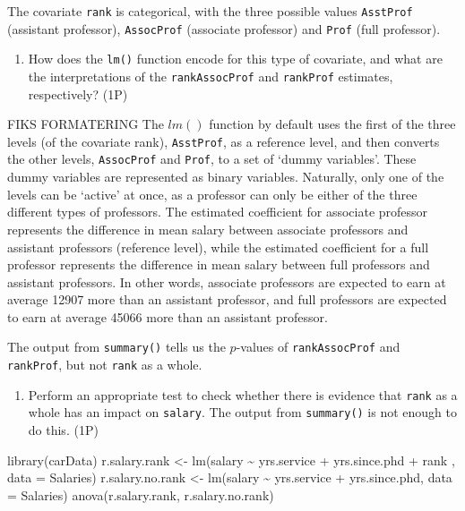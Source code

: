 \documentclass[
]{article}
\newenvironment{Shaded}{\begin{snugshade}}{\end{snugshade}}
\newcommand{\AttributeTok}[1]{\textcolor[rgb]{0.77,0.63,0.00}{#1}}
\newcommand{\FunctionTok}[1]{\textcolor[rgb]{0.00,0.00,0.00}{#1}}
\newcommand{\NormalTok}[1]{#1}
\newcommand{\OtherTok}[1]{\textcolor[rgb]{0.56,0.35,0.01}{#1}}
\newcommand{\SpecialCharTok}[1]{\textcolor[rgb]{0.00,0.00,0.00}{#1}}
\providecommand{\tightlist}{%
  \setlength{\itemsep}{0pt}\setlength{\parskip}{0pt}}
\begin{document}
The covariate \texttt{rank} is categorical, with the three possible
values \texttt{AsstProf} (assistant professor), \texttt{AssocProf}
(associate professor) and \texttt{Prof} (full professor).

\begin{enumerate}
\def\labelenumi{\roman{enumi})}
\tightlist
\item
  How does the \texttt{lm()} function encode for this type of covariate,
  and what are the interpretations of the \texttt{rankAssocProf} and
  \texttt{rankProf} estimates, respectively? (1P)
\end{enumerate}

FIKS FORMATERING The \(lm()\) function by default uses the first of the
three levels (of the covariate rank), \texttt{AsstProf}, as a reference
level, and then converts the other levels, \texttt{AssocProf} and
\texttt{Prof}, to a set of `dummy variables'. These dummy variables are
represented as binary variables. Naturally, only one of the levels can
be `active' at once, as a professor can only be either of the three
different types of professors. The estimated coefficient for associate
professor represents the difference in mean salary between associate
professors and assistant professors (reference level), while the
estimated coefficient for a full professor represents the difference in
mean salary between full professors and assistant professors. In other
words, associate professors are expected to earn at average 12907 more
than an assistant professor, and full professors are expected to earn at
average 45066 more than an assistant professor.

The output from \texttt{summary()} tells us the \(p\)-values of
\texttt{rankAssocProf} and \texttt{rankProf}, but not \texttt{rank} as a
whole.

\begin{enumerate}
\def\labelenumi{\roman{enumi})}
\setcounter{enumi}{1}
\tightlist
\item
  Perform an appropriate test to check whether there is evidence that
  \texttt{rank} as a whole has an impact on \texttt{salary}. The output
  from \texttt{summary()} is not enough to do this. (1P)
\end{enumerate}

\begin{Shaded}
\begin{Highlighting}[]
\FunctionTok{library}\NormalTok{(carData)}
\NormalTok{r.salary.rank }\OtherTok{\textless{}{-}} \FunctionTok{lm}\NormalTok{(salary }\SpecialCharTok{\textasciitilde{}}\NormalTok{ yrs.service }\SpecialCharTok{+}\NormalTok{ yrs.since.phd }\SpecialCharTok{+}\NormalTok{ rank , }\AttributeTok{data =}\NormalTok{ Salaries)}
\NormalTok{r.salary.no.rank }\OtherTok{\textless{}{-}} \FunctionTok{lm}\NormalTok{(salary }\SpecialCharTok{\textasciitilde{}}\NormalTok{ yrs.service }\SpecialCharTok{+}\NormalTok{ yrs.since.phd, }\AttributeTok{data =}\NormalTok{ Salaries)}
\FunctionTok{anova}\NormalTok{(r.salary.rank, r.salary.no.rank)}
\end{Highlighting}
\end{Shaded}
\end{document}
